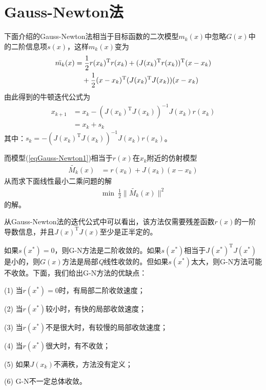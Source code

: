 \section{Gauss-Newton法}
    \par
    下面介绍的Gauss-Newton法相当于目标函数的二次模型$m_k(x)$中忽略$G(x)$中的二阶信息项$s(x)$，这样$m_k(x)$变为
    \begin{align}
    \label{eqGauss-Newton1}
     \bar{m_k}(x)&=\frac 12 r(x_k)^\mathrm{T} r(x_k)+(J(x_k)^\mathrm{T} r(x_k))^\mathrm{T} (x-x_k)\notag \\
                &\quad +\frac 12 (x-x_k)^\mathrm{T} (J(x_k)^\mathrm{T} J(x_k))(x-x_k)
    \end{align}
    由此得到的牛顿迭代公式为
    \begin{align*}
     x_{k+1}&=x_k-(J(x_k)^\mathrm{T} J(x_k))^{-1}J(x_k)r(x_k)\\
     &=x_k+s_k
    \end{align*}
    其中：$s_k=-(J(x_k)^\mathrm{T} J(x_k))^{-1}J(x_k)r(x_k)$。
    \par
    而模型(\ref{eqGauss-Newton1})相当于$r(x)$在$x_k$附近的仿射模型
    \begin{align*}
    \tilde{M_k}(x)&=r(x_k)+J(x_k)(x-x_k)
    \end{align*}
    从而求下面线性最小二乘问题的解
    \begin{align*}
    \min \ \frac 12 \|\tilde{M_k}(x)\|^2
    \end{align*}
    的解。
    \par
    从Gauss-Newton法的迭代公式中可以看出，该方法仅需要残差函数$r(x)$的一阶导数信息，并且$J(x)^\mathrm{T} J(x)$至少是正半定的。
    \par
    如果$s(x^*)=0$，则G-N方法是二阶收敛的。如果$s(x^*)$相当于$J(x^*)^\mathrm{T} J(x^*)$是小的，则$G(x)$方法是局部\textit{Q}线性收敛的。但如果$s(x^*)$太大，则G-N方法可能不收敛。下面，我们给出G-N方法的优缺点：
    \par
    (1) 当$r(x^*)=0$时，有局部二阶收敛速度；
    \par
    (2) 当$r(x^*)$较小时，有快的局部收敛速度；
    \par
    (3) 当$r(x^*)$不是很大时，有较慢的局部收敛速度；
    \par
    (4) 当$r(x^*)$很大时，有不收敛；
    \par
    (5) 如果$J(x_k)$不满秩，方法没有定义；
    \par
    (6) G-N不一定总体收敛。
